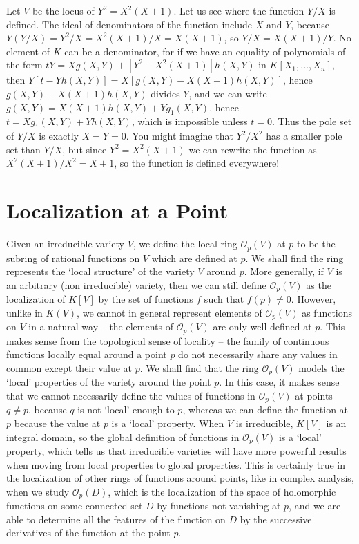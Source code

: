 \begin{example}
    Let $V$ be the locus of $Y^2 = X^2(X+1)$. Let us see where the function $Y/X$ is defined. The ideal of denominators of the function include $X$ and $Y$, because $Y(Y/X) = Y^2/X = X^2(X+1)/X = X(X+1)$, so $Y/X = X(X+1)/Y$. No element of $K$ can be a denominator, for if we have an equality of polynomials of the form $tY = Xg(X,Y) + [Y^2 - X^2(X+1)]h(X,Y)$ in $K[X_1, \dots, X_n]$, then $Y[t - Yh(X,Y)] = X[g(X,Y) - X(X+1)h(X,Y)]$, hence $g(X,Y) - X(X+1)h(X,Y)$ divides $Y$, and we can write $g(X,Y) = X(X+1)h(X,Y) + Yg_1(X,Y)$, hence $t = Xg_1(X,Y) + Yh(X,Y)$, which is impossible unless $t = 0$. Thus the pole set of $Y/X$ is exactly $X = Y = 0$. You might imagine that $Y^2/X^2$ has a smaller pole set than $Y/X$, but since $Y^2 = X^2(X+1)$ we can rewrite the function as $X^2(X+1)/X^2 = X+1$, so the function is defined everywhere!
\end{example}

\section{Localization at a Point}

Given an irreducible variety $V$, we define the local ring $\mathcal{O}_p(V)$ at $p$ to be the subring of rational functions on $V$ which are defined at $p$. We shall find the ring represents the `local structure' of the variety $V$ around $p$. More generally, if $V$ is an arbitrary (non irreducible) variety, then we can still define $\mathcal{O}_p(V)$ as the localization of $K[V]$ by the set of functions $f$ such that $f(p) \neq 0$. However, unlike in $K(V)$, we cannot in general represent elements of $\mathcal{O}_p(V)$ as functions on $V$ in a natural way -- the elements of $\mathcal{O}_p(V)$ are only well defined at $p$. This makes sense from the topological sense of locality -- the family of continuous functions locally equal around a point $p$ do not necessarily share any values in common except their value at $p$. We shall find that the ring $\mathcal{O}_p(V)$ models the `local' properties of the variety around the point $p$. In this case, it makes sense that we cannot necessarily define the values of functions in $\mathcal{O}_p(V)$ at points $q \neq p$, because $q$ is not `local' enough to $p$, whereas we can define the function at $p$ because the value at $p$ is a `local' property. When $V$ is irreducible, $K[V]$ is an integral domain, so the global definition of functions in $\mathcal{O}_p(V)$ is a `local' property, which tells us that irreducible varieties will have more powerful results when moving from local properties to global properties. This is certainly true in the localization of other rings of functions around points, like in complex analysis, when we study $\mathcal{O}_p(D)$, which is the localization of the space of holomorphic functions on some connected set $D$ by functions not vanishing at $p$, and we are able to determine all the features of the function on $D$ by the successive derivatives of the function at the point $p$.

